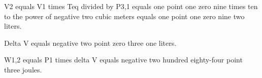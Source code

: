 V2 equals V1 times Teq divided by P3,1 equals one point one zero nine times ten to the power of negative two cubic meters equals one point one zero nine two liters.

Delta V equals negative two point zero three one liters.

W1,2 equals P1 times delta V equals negative two hundred eighty-four point three joules.